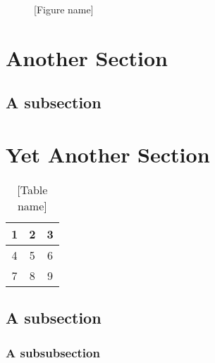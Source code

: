 \begin{figure}
\framebox[\textwidth]{\parbox{\textwidth}{\lipsum[1]}} %
\caption[{[Alternate short name]}]{[Figure name]}
\end{figure}

\section{Another Section}
\lipsum[2-3] %

\subsection{A subsection}
\lipsum[5-6] %

\section{Yet Another Section}
\lipsum[1] %
\begin{table}
\begin{center}
\begin{tabular}{ | c | c | c | }
\hline
  1 & 2 & 3 \\ \hline\hline
  4 & 5 & 6 \\
  7 & 8 & 9 \\
\hline
\end{tabular}\vspace{-1em}%
\end{center}
\caption{[Table name]}
\end{table}
\lipsum[2]

\subsection{A subsection}\label{sec:another}
\lipsum[3]

\subsubsection{A subsubsection}\label{sec:minorstuff}
\lipsum[4]


